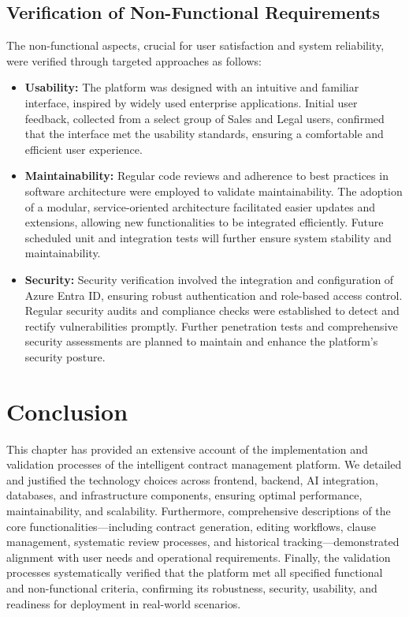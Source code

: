 \subsection{Verification of Non-Functional Requirements}
The non-functional aspects, crucial for user satisfaction and system reliability, were verified through targeted approaches as follows:

\begin{itemize}
    \item \textbf{Usability:} The platform was designed with an intuitive and familiar interface, inspired by widely used enterprise applications. Initial user feedback, collected from a select group of Sales and Legal users, confirmed that the interface met the usability standards, ensuring a comfortable and efficient user experience.
    \item \textbf{Maintainability:} Regular code reviews and adherence to best practices in software architecture were employed to validate maintainability. The adoption of a modular, service-oriented architecture facilitated easier updates and extensions, allowing new functionalities to be integrated efficiently. Future scheduled unit and integration tests will further ensure system stability and maintainability.
    \item \textbf{Security:} Security verification involved the integration and configuration of Azure Entra ID, ensuring robust authentication and role-based access control. Regular security audits and compliance checks were established to detect and rectify vulnerabilities promptly. Further penetration tests and comprehensive security assessments are planned to maintain and enhance the platform's security posture.
\end{itemize}

\section{Conclusion}
This chapter has provided an extensive account of the implementation and validation processes of the intelligent contract management platform. We detailed and justified the technology choices across frontend, backend, AI integration, databases, and infrastructure components, ensuring optimal performance, maintainability, and scalability. Furthermore, comprehensive descriptions of the core functionalities—including contract generation, editing workflows, clause management, systematic review processes, and historical tracking—demonstrated alignment with user needs and operational requirements. Finally, the validation processes systematically verified that the platform met all specified functional and non-functional criteria, confirming its robustness, security, usability, and readiness for deployment in real-world scenarios.
